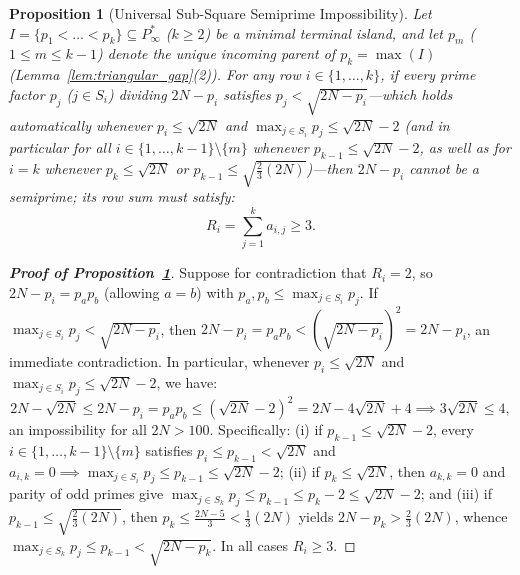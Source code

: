 \documentclass[11pt,a4paper]{article}
\newtheorem{proposition}[theorem]{Proposition}
\theoremstyle{definition}
\begin{document}
\begin{proposition}[Universal Sub-Square Semiprime Impossibility]
\label{prop:semiprime_impossibility}
Let $I = \{p_1 < \dots < p_k\} \subseteq P^*_\infty$ ($k \ge 2$) be a minimal terminal island, and let $p_m$ ($1 \le m \le k - 1$) denote the unique incoming parent of $p_k = \max(I)$ (Lemma~\ref{lem:triangular_gap}(2)). For any row $i \in \{1, \dots, k\}$, if every prime factor $p_j$ ($j \in S_i$) dividing $2N - p_i$ satisfies $p_j < \sqrt{2N - p_i}$---which holds automatically whenever $p_i \le \sqrt{2N}$ and $\max_{j \in S_i} p_j \le \sqrt{2N} - 2$ (and in particular for all $i \in \{1, \dots, k-1\} \setminus \{m\}$ whenever $p_{k-1} \le \sqrt{2N} - 2$, as well as for $i = k$ whenever $p_k \le \sqrt{2N}$ or $p_{k-1} \le \sqrt{\frac{2}{3}(2N)}$)---then $2N - p_i$ cannot be a semiprime; its row sum must satisfy:
\begin{equation}
\label{eq:universal_si_ge_3}
R_i = \sum_{j=1}^k a_{i,j} \ge 3.
\end{equation}
\end{proposition}
\begin{proof}[\textbf{Proof of Proposition~\ref{prop:semiprime_impossibility}}]
Suppose for contradiction that $R_i = 2$, so $2N - p_i = p_a p_b$ (allowing $a = b$) with $p_a, p_b \le \max_{j \in S_i} p_j$. If $\max_{j \in S_i} p_j < \sqrt{2N - p_i}$, then $2N - p_i = p_a p_b < (\sqrt{2N - p_i})^2 = 2N - p_i$, an immediate contradiction. In particular, whenever $p_i \le \sqrt{2N}$ and $\max_{j \in S_i} p_j \le \sqrt{2N} - 2$, we have:
\[
2N - \sqrt{2N} \le 2N - p_i = p_a p_b \le (\sqrt{2N} - 2)^2 = 2N - 4\sqrt{2N} + 4 \implies 3\sqrt{2N} \le 4,
\]
an impossibility for all $2N > 100$. Specifically: (i) if $p_{k-1} \le \sqrt{2N} - 2$, every $i \in \{1, \dots, k-1\} \setminus \{m\}$ satisfies $p_i \le p_{k-1} < \sqrt{2N}$ and $a_{i,k} = 0 \implies \max_{j \in S_i} p_j \le p_{k-1} \le \sqrt{2N} - 2$; (ii) if $p_k \le \sqrt{2N}$, then $a_{k,k} = 0$ and parity of odd primes give $\max_{j \in S_k} p_j \le p_{k-1} \le p_k - 2 \le \sqrt{2N} - 2$; and (iii) if $p_{k-1} \le \sqrt{\frac{2}{3}(2N)}$, then $p_k \le \frac{2N-5}{3} < \frac{1}{3}(2N)$ yields $2N - p_k > \frac{2}{3}(2N)$, whence $\max_{j \in S_k} p_j \le p_{k-1} < \sqrt{2N - p_k}$. In all cases $R_i \ge 3$.
\end{proof}
\end{document}
